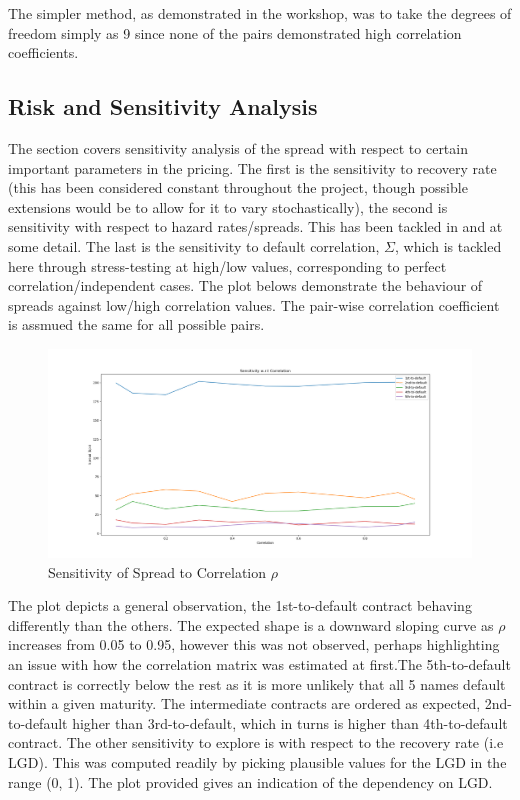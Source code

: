 \documentclass[a4paper,12pt]{article}
\begin{document}
The simpler method, as demonstrated in the workshop, was to take the degrees of freedom simply as 9 since none of the pairs demonstrated high correlation coefficients. 

\subsection{Risk and Sensitivity Analysis}
The section covers sensitivity analysis of the spread with respect to certain important parameters in the pricing. The first is the sensitivity to recovery rate (this has been considered constant throughout the project, though possible extensions would be to allow for it to vary stochastically), the second is sensitivity with respect to hazard rates/spreads. This has been tackled in \cite{joshi_kainth} and \cite{peter_jackel} at some detail. The last is the sensitivity to default correlation, $\Sigma$, which is tackled here through stress-testing at high/low values, corresponding to perfect correlation/independent cases. The plot belows demonstrate the behaviour of spreads against low/high correlation values. The pair-wise correlation coefficient is assmued the same for all possible pairs.

\begin{figure}[h]

\centering
\includegraphics[width=1\textwidth]{sensitivity_wrt_correlation}
\caption{Sensitivity of Spread to Correlation $\rho$}
\label{image-sens_rho}

\end{figure} 

The plot depicts a general observation, the 1st-to-default contract behaving differently than the others. The expected shape is a downward sloping curve as $\rho$ increases from 0.05 to 0.95, however this was not observed, perhaps highlighting an issue with how the correlation matrix was estimated at first.The 5th-to-default contract is correctly below the rest as it is more unlikely that all 5 names default within a given maturity. The intermediate contracts are ordered as expected, 2nd-to-default higher than 3rd-to-default, which in turns is higher than 4th-to-default contract. 
\newline
The other sensitivity to explore is with respect to the recovery rate (i.e LGD). This was computed readily by picking plausible values for the LGD in the range (0, 1). The plot provided gives an indication of the dependency on LGD.
\end{document}
